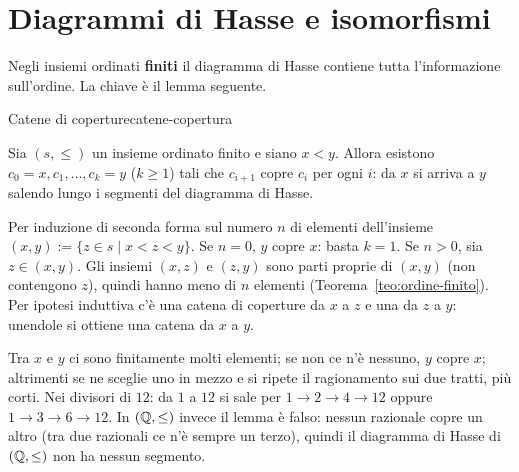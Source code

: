 \section{Diagrammi di Hasse e isomorfismi}\label{sec:hasse-isomorfismo}

Negli insiemi ordinati \textbf{finiti} il diagramma di Hasse contiene tutta l'informazione sull'ordine. La chiave è il lemma seguente.

\begin{concetto}
\begin{Lemma}{Catene di coperture}{catene-copertura}
    \begin{prerequisiti}
    \end{prerequisiti}
    Sia $(s, \leq)$ un insieme ordinato finito e siano $x < y$. Allora esistono $c_0 = x, c_1, \dots, c_k = y$ ($k \geq 1$) tali che $c_{i + 1}$ copre $c_i$
    per ogni $i$: da $x$ si arriva a $y$ salendo lungo i segmenti del diagramma di Hasse.
\end{Lemma}
\begin{dimostrazione}
    Per induzione di seconda forma sul numero $n$ di elementi dell'insieme $(x, y) := \{z \in s \mid x < z < y\}$. Se $n = 0$, $y$ copre $x$: basta $k = 1$.
    Se $n > 0$, sia $z \in (x, y)$. Gli insiemi $(x, z)$ e $(z, y)$ sono parti proprie di $(x, y)$ (non contengono $z$), quindi hanno meno di $n$
    elementi (Teorema~\ref{teo:ordine-finito}). Per ipotesi induttiva c'è una catena di coperture da $x$ a $z$ e una da $z$ a $y$: unendole si ottiene
    una catena da $x$ a $y$.
\end{dimostrazione}
\end{concetto}

\begin{spiegazione}
    Tra $x$ e $y$ ci sono finitamente molti elementi; se non ce n'è nessuno, $y$ copre $x$; altrimenti se ne sceglie uno in mezzo e si
    ripete il ragionamento sui due tratti, più corti. Nei divisori di $12$: da $1$ a $12$ si sale per $1 \to 2 \to 4 \to 12$ oppure $1 \to 3 \to 6 \to 12$.
    In $(\mathbb{Q}, \leq)$ invece il lemma è falso: nessun razionale copre un altro (tra due razionali ce n'è sempre un terzo), quindi il diagramma
    di Hasse di $(\mathbb{Q}, \leq)$ non ha nessun segmento.
\end{spiegazione}

